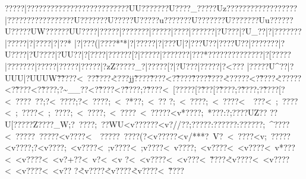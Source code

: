 {{{{{{{{{{{{{{{{{{{{{{{{{{{{{{{{{{{{{{{{{{{{{{{{{{{{{{{{{{{{{{{{{{{{{{{{{{{{{{{{{{{{{{{{{{{{{{{{{{{{{{{{{{{{{{{{{{{{{{{{{{{{{{{{{{{{{{{{{{{{{{{{{{{{{{{{{{{{{{{{{{{{{{{{{{{{{{{{{{{{{{{{{{{{{{{{{{{{{{{{{{{{{{{{{{{{{{{{{{{{{{{{{{{{{{{{{{{{{{{{{{{{{{{{{{{{{{{{{{{{{{{{{{{{{{{{{{{{{{{{{{{{{{{{{{{{{{{{{{{{{{{{{{{{{{{{{{{{{{{{{{{{{{{{{{{{{{{{{{{{{{{{{{{{{{{{{{{{{{{{{{{{{{{{{{{{{{{{{{{{{{{{{{{{{{{{{{{{{{{{{{{{{{{{{{{{{{{{{{{{{{{{{{{{{{{{{{{{{{{{{{{{{{{{{{{{{{{{{{{{{{{{{{{{{{{{{{{{{{{{{{{{{{{{{{{{{{{{{{{{{{{{{{{{{{{{{{{{{{{{{{{{{{{{{{{{{{{{{{{{{{{{{{{{{{{{{{{{{{{{{{{{{{{{{{{{{{{{{{{{{{{{{{{{{{{{{{{{{{{{{{{{{{{{{{{{{{{{{{{{{{{{{{{{{{{{{{{{{{{{{{{{{{{{{{{{{{{{{{{{{{{{{{{{{{{{{{{{{{{{{{{{{{{{{{{{{{{{{{{{{{{{{{{{{{{{{{{{{{{{{{{{{{{{{{{{{{{{{{{{{{{{{{{{{{{{{{{{{{{{{{{{{{{{{{{{{{{{{{{{{{{{{{{{{{{{{{{{{{{{{{{{{{{{{{{{{{{{{{{{{{{{{{{{{{{{{{{{{{{{{{{{{{{{{{{{{{{{{{{{{{{{{{{{{{{{{{{{{{{{{{{{{{{{{{{{{{{{{{{{{{{{{{{{{{{{{{{{{{{{{{{{{{{{{{{{{{{{{{{{{{{{{{{{{{{{{{{{{{{{{{{{{{{{{{{{{{{{{{{{{{{{{{{{{{{{{{{{{{{{{{{{{{{{{{{{{{{{{{{{{{{{{{{{{{{{{{{{{{{{{{{{{{{{{{{{{{{{{{{{{{{{{{{{{{{{{{{{{{{{{{{{{{{{{{{{{{{{{{{{{{{{{{{{{{{{{{{{{{{{{{{{{{{{{{{{{{{{{{{{{{{{{{{{{{{{{{{{{{{{{{{{{{{{{{{{{{{{{{{{{{{{{{{{{{{{{{{{{{{{{{{{{{{{{{{{{{{{{{{{{{{{{{{{{{{{{{{{{{{{{{{{{{{{{{{{{{{{{{{{{{{{{{{{{{{{{{{{{{{{{{{{{{{{{{{{{{{{{{{{{{{{{{{{{{{{{{{{{{{{{{{{{{{{{{{{{{{{{{{{{{{{{{{{{{{{{{{{{{{{{{{{{{{{{{{{{{{{{{{{{{{{{{{{{{{{{{{{{{{{{{{{{{{{{{{{{{{{{{{{{{{{{{{{{{{{{{{{{{{{{{{{{{{{{{{{{{{{{{{{{{{{{{{{{{{{{{{{{{{{{{{{{{{{{{{{{{{{{{{{{{{{{{{{{{{{{{{{{{{{{{{{{{{{{{{{{{{{{{{{{{{{{{{{{{{{{{{{{{{{{{{{{{{{{{{{{{{{{{{{{{{{{{{{{{{{{{{{{{{{{{{{{{{{{{{{{{{{{{{{{{{{{{{{{{{{{{{{{{{{{{{{{{{{{{{{{{{{{{{{{{{{{{{{{{{{{{{{{{{{{{{{{{{{{{{{{{{{{{{{{{{{{{{{{{{{{{{{{{{{{{{{{{{{{{{{{{{{{{{{{{{{{{{{{{{{{{{{{{{{{{{{{{{{{{{{{{{{{{{{{{{{{{{{{{{{{{{{{{{{{{{{{{{{{{{{{{{{{{{{{{{{{{{{{{{{{{{{{{{{{{{{{{{{{{{{{{{{{{{{{{{{{{{{{{{{{{{{{{{{{{{{{{{{{{{{{{{{{{{{{{{{{{{{{{{{{{{{{{{{{{{{{{{{{{{{{{{{{{{{{{{{{{{{{{{{{{{{{{{{{{{{{{{{{{{{{{{{{{{{{{{{{{{{{{{{{{{{{{{{{{{{{{{{{{{{{{{{{{{{{{{{{{{{{{{{{{{{{{{{{{{{{{{{{{{{{{{{{{{{{{{{{{{{{{{{{{{{{{{{{{{{{{{{{{{{{{{{{{{{{{{{{{{{{{{{{{{{{{{{{{{{{?????|? ?????????????????????????UU???????U????_?????Uz????????? ??????? ??|?????????????????U???????U?????U?????u???????U???????U???????Uu??????U?????UW??????UU????|?????|???????|?????|?? ??|??????|?U???|?U_??|?|???????|?????|?|???? |?|??*
|?|???(|????*"*|?|?????|?|???U|?|???U??|????U??|???????|?U???{?|?U???{?|?UU??|?[???? |?{?????[?|?????|?{?????{?|???*?{?\???{?\?????{?\?????|?[?????\?|?????\???|?\?????|?\?????|?\?????|?\?zZ????\??_?|?\?????[?|?U???|?\?????|?<???  |?\?????\?\?U^??|?\?UUU|?\?UUUW\?\~? \?\~????\?<~??\?\~????\~<???jj\?\~????\?\~????<?\~????\?\~????\?\~????\~<?????<?\~????\~<?????<?\~????<?\~????;?\~__??<?\~????<?\~????;?\~????<~[?????[?\~???[?\~????;?\~????;?\~????[?<~????\?~??;?<~????;?<~????;~<~?*??;~<~??
?;~<~????;~<~????<~~???<~;~????<~;~????<~;~????;~<~????;~<~????~<~?????<v*????;~*???:?;????UZ??
??U[?? ???Z????_W;?~ ????;~??WU<v??????<v?//??;?????:??????:??????;~^????<~?????~?????<v????<~~?????~??? ?( ?<v?????<v/***?~V\X?~<~????<v;~?????<v????;?<v????;~<v????<~;v????<~;v????<~v????;~<v????<~<v????<~v*???<~<v????<~<v?+??<~v?  <~<v
  ?<~<v????<~<v??? <~\v????\~<v????<~<v????<~<v????<~<v??
?\~<v????\~<v????\~<v????<~\v????}}}}}}}}}}}}}}}}}}}}}}}}}}}}}}}}}}}}}}}}}}}}}}}}}}}}}}}}}}}}}}}}}}}}}}}}}}}}}}}}}}}}}}}}}}}}}}}}}}}}}}}}}}}}}}}}}}}}}}}}}}}}}}}}}}}}}}}}}}}}}}}}}}}}}}}}}}}}}}}}}}}}}}}}}}}}}}}}}}}}}}}}}}}}}}}}}}}}}}}}}}}}}}}}}}}}}}}}}}}}}}}}}}}}}}}}}}}}}}}}}}}}}}}}}}}}}}}}}}}}}}}}}}}}}}}}}}}}}}}}}}}}}}}}}}}}}}}}}}}}}}}}}}}}}}}}}}}}}}}}}}}}}}}}}}}}}}}}}}}}}}}}}}}}}}}}}}}}}}}}}}}}}}}}}}}}}}}}}}}}}}}}}}}}}}}}}}}}}}}}}}}}}}}}}}}}}}}}}}}}}}}}}}}}}}}}}}}}}}}}}}}}}}}}}}}}}}}}}}}}}}}}}}}}}}}}}}}}}}}}}}}}}}}}}}}}}}}}}}}}}}}}}}}}}}}}}}}}}}}}}}}}}}}}}}}}}}}}}}}}}}}}}}}}}}}}}}}}}}}}}}}}}}}}}}}}}}}}}}}}}}}}}}}}}}}}}}}}}}}}}}}}}}}}}}}}}}}}}}}}}}}}}}}}}}}}}}}}}}}}}}}}}}}}}}}}}}}}}}}}}}}}}}}}}}}}}}}}}}}}}}}}}}}}}}}}}}}}}}}}}}}}}}}}}}}}}}}}}}}}}}}}}}}}}}}}}}}}}}}}}}}}}}}}}}}}}}}}}}}}}}}}}}}}}}}}}}}}}}}}}}}}}}}}}}}}}}}}}}}}}}}}}}}}}}}}}}}}}}}}}}}}}}}}}}}}}}}}}}}}}}}}}}}}}}}}}}}}}}}}}}}}}}}}}}}}}}}}}}}}}}}}}}}}}}}}}}}}}}}}}}}}}}}}}}}}}}}}}}}}}}}}}}}}}}}}}}}}}}}}}}}}}}}}}}}}}}}}}}}}}}}}}}}}}}}}}}}}}}}}}}}}}}}}}}}}}}}}}}}}}}}}}}}}}}}}}}}}}}}}}}}}}}}}}}}}}}}}}}}}}}}}}}}}}}}}}}}}}}}}}}}}}}}}}}}}}}}}}}}}}}}}}}}}}}}}}}}}}}}}}}}}}}}}}}}}}}}}}}}}}}}}}}}}}}}}}}}}}}}}}}}}}}}}}}}}}}}}}}}}}}}}}}}}}}}}}}}}}}}}}}}}}}}}}}}}}}}}}}}}}}}}}}}}}}}}}}}}}}}}}}}}}}}}}}}}}}}}}}}}}}}}}}}}}}}}}}}}}}}}}}}}}}}}}}}}}}}}}}}}}}}}}}}}}}}}}}}}}}}}}}}}}}}}}}}}}}}}}}}}}}}}}}}}}}}}}}}}}}}}}}}}}}}}}}}}}}}}}}}}}}}}}}}}}}}}}}}}}}}}}}}}}}}}}}}}}}}}}}}}}}}}}}}}}}}}}}}}}}}}}}}}}}}}}}}}}}}}}}}}}}}}}}}}}}}}}}}}}}}}}}}}}}}}}}}}}}}}}}}}}}}}}}}}}}}}}}}}}}}}}}}}}}}}}}}}}}}}}}}}}}}}}}}}}}}}}}}}}}}}}}}}}}}}}}}}}}}}}}}}}}}}}}}}}}}}}}}}}}}}}}}}}}}}}}}}}}}}}}}}}}}}}}}}}}}}}}}}}}}}}}}}}}}}}}}}}}}}}}}}}}}}}}}}}}}}}}}}}}}}}}}}}}}}}}}}}}}}}}}}}}}}}}}}}}}}}}}}}}}}}}}}}}}}}}}}}}}}}}}}}}}}}}}}}}}}}}}}}}}}}}}}}}}}}}}}}}}}}}}}}}}}}}}}}}}}}}}}}}}}}}}}}}}}}}}}}}}}}}}}}}}}}}}}}}}}}}}}}}}}}}}}}}}}}}}}}}}}}}}}}}}}}}}}}}}}}}}}}}}}}}}}}}}}}}}}}}}}}}}}}}}}}}}}}}}}}}}}}}}}}}}}}}}}}}}}}}}}}}}}}}}}}}}}}}}}}}}}}}}}}}}}}}}}}}}}}}}}}}}}}}}}}}}}}}}}}}}}}}}}}}}}}}}}}}}}}}}}}}}}}}}}}}}}}}}}}}}}}}}}}}}}}}}}}}}}}}}}}}}}}}}}}}}}}}}}}}}}}}}}}}}}}}}}}}}}}}}}}}}}}}}}}}}}}}}}}}}}}}}}}}}}}}}}}}}}}}}}}}}}}}}}}}}}}}}}}
